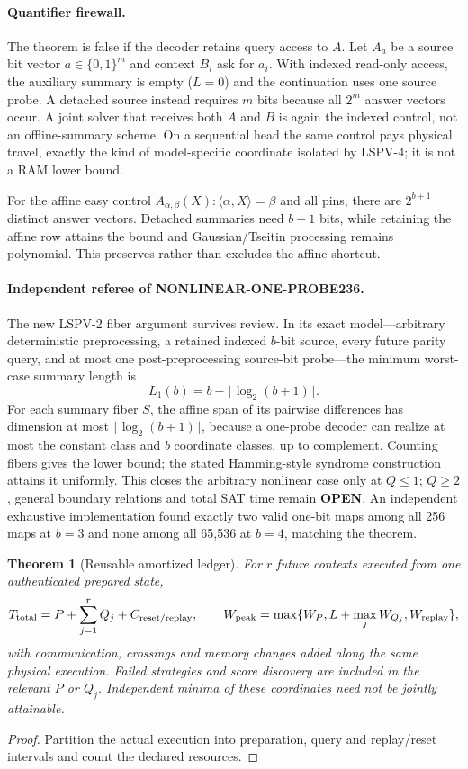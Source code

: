 \documentclass[11pt]{article}
\newtheorem{theorem}{Theorem}
\newcommand{\OPEN}{\textbf{OPEN}}
\begin{document}
\paragraph{Quantifier firewall.}
The theorem is false if the decoder retains query access to $A$.  Let
$A_a$ be a source bit vector $a\in\{0,1\}^m$ and context $B_i$ ask for $a_i$.
With indexed read-only access, the auxiliary summary is empty ($L=0$) and the
continuation uses one source probe.  A detached source instead requires $m$
bits because all $2^m$ answer vectors occur.  A joint solver that receives both
$A$ and $B$ is again the indexed control, not an offline-summary scheme.
On a sequential head the same control pays physical travel, exactly the kind
of model-specific coordinate isolated by LSPV-4; it is not a RAM lower bound.

For the affine easy control
$A_{\alpha,\beta}(X):\langle\alpha,X\rangle=\beta$ and all pins, there are
$2^{b+1}$ distinct answer vectors.  Detached summaries need $b+1$ bits, while
retaining the affine row attains the bound and Gaussian/Tseitin processing
remains polynomial.  This preserves rather than excludes the affine shortcut.

\paragraph{Independent referee of NONLINEAR-ONE-PROBE236.}
The new LSPV-2 fiber argument survives review.  In its exact model---arbitrary
deterministic preprocessing, a retained indexed $b$-bit source, every future
parity query, and at most one post-preprocessing source-bit probe---the minimum
worst-case summary length is
\[
 L_1(b)=b-\lfloor\log_2(b+1)\rfloor.
\]
For each summary fiber $S$, the affine span of its pairwise differences has
dimension at most $\lfloor\log_2(b+1)\rfloor$, because a one-probe decoder can
realize at most the constant class and $b$ coordinate classes, up to
complement.  Counting fibers gives the lower bound; the stated Hamming-style
syndrome construction attains it uniformly.  This closes the arbitrary
nonlinear case only at $Q\le1$; $Q\ge2$, general boundary relations and total
SAT time remain \OPEN.  An independent exhaustive implementation found exactly
two valid one-bit maps among all 256 maps at $b=3$ and none among all 65,536 at
$b=4$, matching the theorem.

\begin{theorem}[Reusable amortized ledger]
For $r$ future contexts executed from one authenticated prepared state,
\[
 T_{\rm total}=P+\sum_{j=1}^r Q_j+C_{\rm reset/replay},\qquad
 W_{\rm peak}=\max\{W_P,L+\max_j W_{Q_j},W_{\rm replay}\},
\]
with communication, crossings and memory changes added along the same physical
execution.  Failed strategies and score discovery are included in the relevant
$P$ or $Q_j$.  Independent minima of these coordinates need not be jointly
attainable.
\end{theorem}
\begin{proof}Partition the actual execution into preparation, query and replay/reset intervals and count the declared resources.\end{proof}
\end{document}
